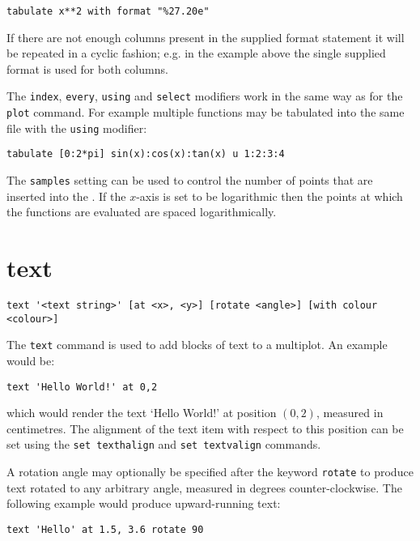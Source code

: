 \begin{verbatim}
tabulate x**2 with format "%27.20e"
\end{verbatim}

If there are not enough columns present in the supplied format statement it
will be repeated in a cyclic fashion; e.g. in the example above the single
supplied format is used for both columns.

The {\tt index}, {\tt every}, {\tt using} and {\tt select} modifiers work in the
same way as for the {\tt plot} command.  For example multiple functions may be
tabulated into the same file with the {\tt using} modifier:

\begin{verbatim}
tabulate [0:2*pi] sin(x):cos(x):tan(x) u 1:2:3:4
\end{verbatim}

The {\tt samples} setting can be used to control the number of points that are
inserted into the \datafile.  If the $x$-axis is set to be logarithmic then the
points at which the functions are evaluated are spaced logarithmically.

\section{text}

\begin{verbatim}
text '<text string>' [at <x>, <y>] [rotate <angle>] [with colour <colour>]
\end{verbatim}

The {\tt text} command is used to add blocks of text to a multiplot. An example
would be:

\begin{verbatim}
text 'Hello World!' at 0,2
\end{verbatim}

\noindent which would render the text `Hello World!' at position $(0,2)$,
measured in centimetres. The alignment of the text item with respect to this
position can be set using the {\tt set texthalign} and {\tt set textvalign}
commands.

A rotation angle may optionally be specified after the keyword {\tt rotate}
to produce text rotated to any arbitrary angle, measured in degrees
counter-clockwise. The following example would produce upward-running text:

\begin{verbatim}
text 'Hello' at 1.5, 3.6 rotate 90
\end{verbatim}

